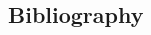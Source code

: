\documentclass[final]{beamer}
\begin{document}
\begin{frame}[t]
\begin{multicols}{3}
\section{Bibliography}\label{bibliography}

~


\begin{footnotesize}






\end{footnotesize}

\end{multicols}

\end{frame}
\end{document}
